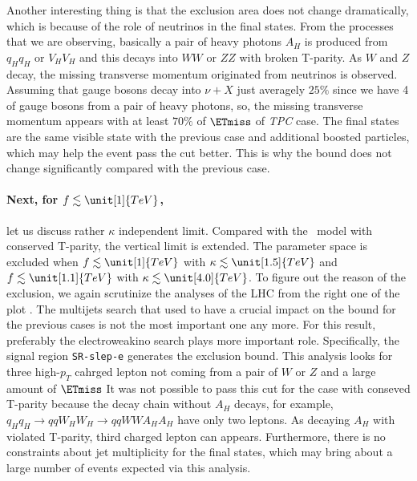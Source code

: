 Another interesting thing is that the exclusion area does not change dramatically, which is because of the role of neutrinos in the final states. 
From the processes that we are observing, basically a pair of heavy photons $A_H$ is produced from $q_H q_H$ or $V_H V_H$ and
this decays into $WW$ or $ZZ$ with broken T-parity. 
As $W$ and $Z$ decay, the missing transverse momentum originated from neutrinos is observed. 
Assuming that gauge bosons decay into $\nu+X$ just averagely $25\%$ since we have 4 of gauge bosons from a pair of heavy photons, 
so, the missing transverse momentum appears with at least $70\%$ of $\ETmiss$ of \emph{TPC} case.
The final states are the same visible state with the previous case and additional boosted particles, which may help the event pass the cut better. 
This is why the bound does not change significantly compared with the previous case.


\paragraph{Next, for $f \lesssim \unit[1]{TeV}$,} let us discuss rather $\kappa$ independent limit.  
Compared with the \fu~model with conserved T-parity, the vertical limit is extended. 
The parameter space is excluded when $f \lesssim \unit[1]{TeV}$ with $\kappa \lesssim \unit[1.5]{TeV}$ 
and $f \lesssim \unit[1.1]{TeV}$ with $\kappa \lesssim \unit[4.0]{TeV}$. 
To figure out the reason of the exclusion, we again scrutinize the analyses of the LHC from the right one of the plot . 
The multijets search that used to have a crucial impact on the bound for the previous cases is not the most important one any more.
For this result, preferably the electroweakino search plays more important role. Specifically, the signal region \texttt{SR-slep-e} generates the exclusion bound.
This analysis looks for three high-$p_T$ cahrged lepton not coming from a pair of $W$ or $Z$ and a large amount of $\ETmiss$
It was not possible to pass this cut for the case with conseved T-parity because the decay chain without $A_H$ decays, for example,
$q_H q_H \to qq W_H W_H \to qqWWA_H A_H$ have only two leptons. As decaying $A_H$ with violated T-parity, third charged lepton can appears. 
Furthermore, there is no constraints about jet multiplicity for the final states, which may bring about a large number of events expected via this analysis. 




